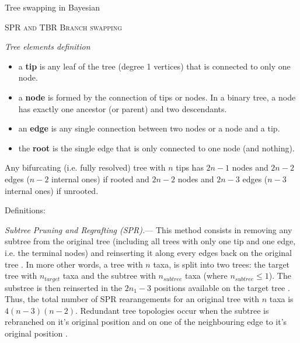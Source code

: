 \documentclass[12pt,letterpaper]{article}
\renewcommand{\section}[1]{%
\bigskip
\begin{center}
\begin{Large}
\normalfont\scshape #1
\medskip
\end{Large}
\end{center}}
\renewcommand{\subsection}[1]{%
\bigskip
\begin{center}
\begin{large}
\normalfont\itshape #1
\end{large}
\end{center}}
\renewcommand{\subsubsection}[1]{%
\vspace{2ex}
\noindent
\textit{#1.}---}
\begin{document}
Tree swapping in Bayesian \citep{lakner2008efficiency}

\section{SPR and TBR Branch swapping}

\subsection{Tree elements definition}
\begin{itemize}
    \item a \textbf{tip} is any leaf of the tree (degree 1 vertices) that is connected to only one node.
    \item a \textbf{node} is formed by the connection of tips or nodes. In a binary tree, a node has exactly one ancestor (or parent) and two descendants.
    \item an \textbf{edge} is any single connection between two nodes or a node and a tip.
    \item the \textbf{root} is the single edge that is only connected to one node (and nothing).
\end{itemize}
Any bifurcating (i.e. fully resolved) tree with $n$ tips has $2n-1$ nodes and $2n-2$ edges ($n-2$ internal ones) if rooted and $2n-2$ nodes and $2n-3$ edges ($n-3$ internal ones) if unrooted.

Definitions: \cite{allen2001subtree,felsenstein2004inferring}

\subsubsection{Subtree Pruning and Regrafting (SPR)}
This method consists in removing any subtree from the original tree (including all trees with only one tip and one edge, i.e. the terminal nodes) and reinserting it along every edges back on the original tree \citep[see Fig \ref{Figure_Felsenstein};]{felsenstein2004inferring}.
In more other words, a tree with $n$ taxa, is split into two trees: the target tree with $n_{target}$ taxa and the subtree with $n_{subtree}$ taxa (where $n_{subtree} \leq 1$).
The substree is then reinserted in the $2n_{1}-3$ positions available on the target tree \citep{felsenstein2004inferring}.
Thus, the total number of SPR rearangements for an original tree with $n$ taxa is $4(n-3)(n-2)$.
Redundant tree topologies occur when the subtree is rebranched on it's original position and on one of the neighbouring edge to it's original position \citep{allen2001subtree}.
\end{document}
